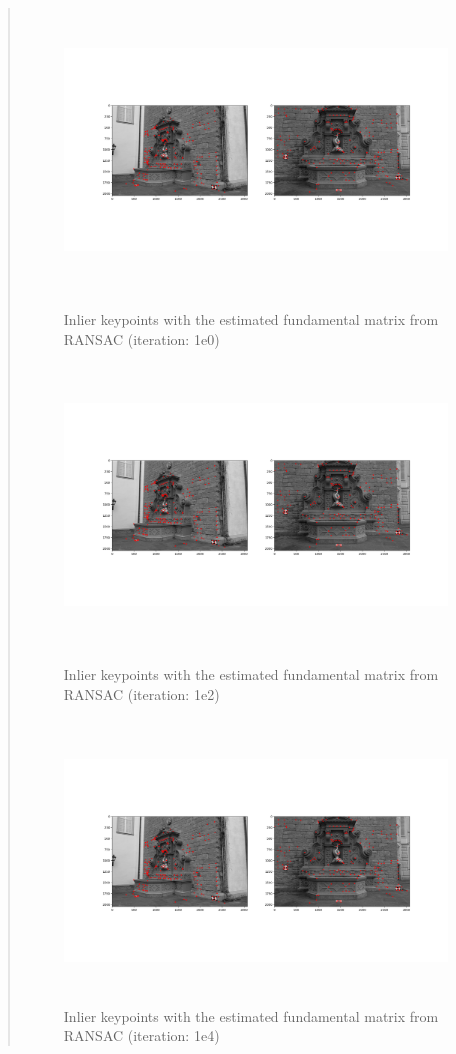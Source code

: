 \documentclass[11pt]{article}
\begin{document}
\begin{quote}
\begin{figure}[h]
    \centering
    \includegraphics[height=7.5cm]{figs/ransac_num_iter_1e0.png} %
    \caption{Inlier keypoints with the estimated fundamental matrix from RANSAC (iteration: 1e0)}
    \includegraphics[height=7.5cm]{figs/ransac_num_iter_1e2.png}
    \caption{Inlier keypoints with the estimated fundamental matrix from RANSAC (iteration: 1e2)}
    \includegraphics[height=7.5cm]{figs/ransac_num_iter_1e4.png}
    \caption{Inlier keypoints with the estimated fundamental matrix from RANSAC (iteration: 1e4)}
    \label{fig:ransac}
\end{figure}



\end{quote}
\end{document}
